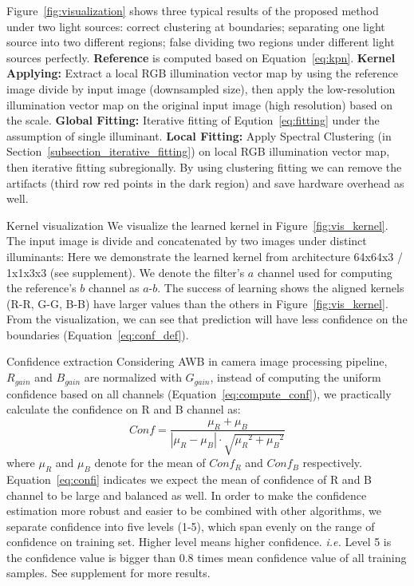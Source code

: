 \documentclass[10pt,twocolumn,letterpaper]{article}
\begin{document}
Figure~\ref{fig:visualization} shows three typical results of the proposed method under two light sources:
correct clustering at boundaries;
separating one light source into two different regions;
false dividing two regions under different light sources perfectly.
\textbf{Reference} is computed based on Equation~\ref{eq:kpn}.
\textbf{Kernel Applying:} Extract a local RGB illumination vector map by using the reference image divide by input image (downsampled size),
then apply the low-resolution illumination vector map on the original input image (high resolution) based on the scale.
\textbf{Global Fitting:} Iterative fitting of Eqution~\ref{eq:fitting} under the assumption of single illuminant.
\textbf{Local Fitting:} Apply Spectral Clustering (in Section~\ref{subsection_iterative_fitting}) on local RGB illumination vector map,
then iterative fitting subregionally.
By using clustering fitting we can remove the artifacts (third row red points in the dark region) and save hardware overhead as well.

\begin{paragraph} {Kernel visualization}
  We visualize the learned kernel in Figure~\ref{fig:vis_kernel}.
  The input image is divide and concatenated by two images under distinct illuminants:
  Here we demonstrate the learned kernel from architecture 64x64x3 / 1x1x3x3 (see supplement).
  We denote the filter's $a$ channel used for computing the reference's $b$ channel as $a$-$b$.
  The success of learning shows the aligned kernels (R-R, G-G, B-B) have larger values than the others in Figure~\ref{fig:vis_kernel}.
  From the visualization, we can see that prediction will have less confidence on the boundaries (Equation~\ref{eq:conf_def}).
\end{paragraph}

\begin{paragraph} {Confidence extraction}
  Considering AWB in camera image processing pipeline, $R_{gain}$ and $B_{gain}$ are normalized with $G_{gain}$,
  instead of computing the uniform confidence based on all channels (Equation~\ref{eq:compute_conf}),
  we practically calculate the confidence on R and B channel as:
  \begin{equation}
    Conf = \frac{\mu_R +\mu_B}{|\mu_R - \mu_B| \cdot \sqrt{{\mu_R}^2 + {\mu_B}^2}}
    \label{eq:confi}
  \end{equation}
  where $\mu_R$ and $\mu_B$ denote for the mean of $Conf_R$ and $Conf_B$ respectively.
  Equation~\ref{eq:confi} indicates we expect the mean of confidence of R and B channel to be large and balanced as well.
  In order to make the confidence estimation more robust and easier to be combined with other algorithms,
  we separate confidence into five levels (1-5), which span evenly on the range of confidence on training set.
  Higher level means higher confidence.
  \textit{i.e.} Level 5 is the confidence value is bigger than 0.8 times mean confidence value of all training samples.
  See supplement for more results.
\end{paragraph}
\end{document}
